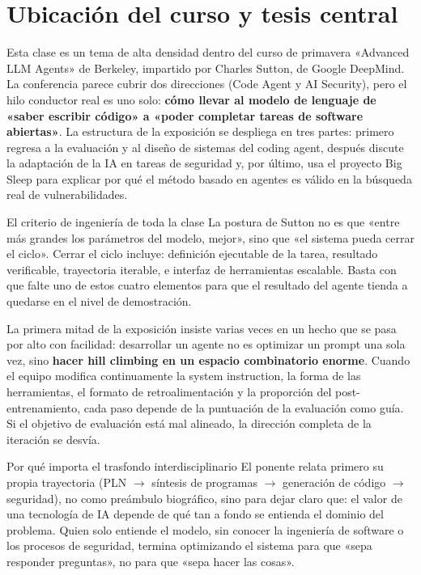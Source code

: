 \section{Ubicación del curso y tesis central}

Esta clase es un tema de alta densidad dentro del curso de primavera «Advanced LLM Agents» de Berkeley, impartido por Charles Sutton, de Google DeepMind. La conferencia parece cubrir dos direcciones (Code Agent y AI Security), pero el hilo conductor real es uno solo: \textbf{cómo llevar al modelo de lenguaje de «saber escribir código» a «poder completar tareas de software abiertas»}. La estructura de la exposición se despliega en tres partes: primero regresa a la evaluación y al diseño de sistemas del coding agent, después discute la adaptación de la IA en tareas de seguridad y, por último, usa el proyecto Big Sleep para explicar por qué el método basado en agentes es válido en la búsqueda real de vulnerabilidades.

\begin{importantbox}{El criterio de ingeniería de toda la clase}
La postura de Sutton no es que «entre más grandes los parámetros del modelo, mejor», sino que «el sistema pueda cerrar el ciclo». Cerrar el ciclo incluye: definición ejecutable de la tarea, resultado verificable, trayectoria iterable, e interfaz de herramientas escalable. Basta con que falte uno de estos cuatro elementos para que el resultado del agente tienda a quedarse en el nivel de demostración.
\end{importantbox}

La primera mitad de la exposición insiste varias veces en un hecho que se pasa por alto con facilidad: desarrollar un agente no es optimizar un prompt una sola vez, sino \textbf{hacer hill climbing en un espacio combinatorio enorme}. Cuando el equipo modifica continuamente la system instruction, la forma de las herramientas, el formato de retroalimentación y la proporción del post-entrenamiento, cada paso depende de la puntuación de la evaluación como guía. Si el objetivo de evaluación está mal alineado, la dirección completa de la iteración se desvía.

\begin{knowledgebox}{Por qué importa el trasfondo interdisciplinario}
El ponente relata primero su propia trayectoria (PLN $\rightarrow$ síntesis de programas $\rightarrow$ generación de código $\rightarrow$ seguridad), no como preámbulo biográfico, sino para dejar claro que: el valor de una tecnología de IA depende de qué tan a fondo se entienda el dominio del problema. Quien solo entiende el modelo, sin conocer la ingeniería de software o los procesos de seguridad, termina optimizando el sistema para que «sepa responder preguntas», no para que «sepa hacer las cosas».
\end{knowledgebox}

